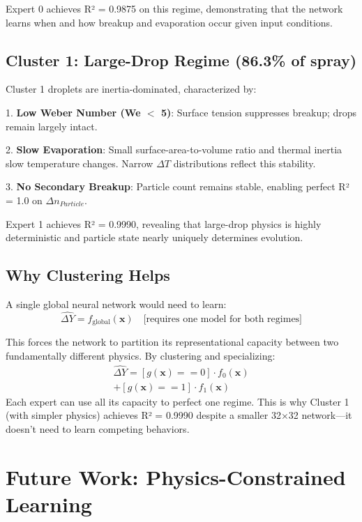 \documentclass[letterpaper,twocolumn,10pt]{article}
\begin{document}
Expert 0 achieves R² = 0.9875 on this regime, demonstrating that the network learns when and how breakup and evaporation occur given input conditions.

\subsection{Cluster 1: Large-Drop Regime (86.3\% of spray)}

Cluster 1 droplets are inertia-dominated, characterized by:

1. \textbf{Low Weber Number (We $<$ 5)}: Surface tension suppresses breakup; drops remain largely intact.

2. \textbf{Slow Evaporation}: Small surface-area-to-volume ratio and thermal inertia slow temperature changes. Narrow $\Delta T$ distributions reflect this stability.

3. \textbf{No Secondary Breakup}: Particle count remains stable, enabling perfect R² = 1.0 on $\Delta n_{Particle}$.

Expert 1 achieves R² = 0.9990, revealing that large-drop physics is highly deterministic and particle state nearly uniquely determines evolution.

\subsection{Why Clustering Helps}

A single global neural network would need to learn:
\begin{equation}
\hat{\Delta Y} = f_{\text{global}}(\mathbf{x}) \quad \text{[requires one model for both regimes]}
\end{equation}

This forces the network to partition its representational capacity between two fundamentally different physics. By clustering and specializing:
\begin{multline*}
\hat{\Delta Y} = [g(\mathbf{x}) == 0] \cdot f_0(\mathbf{x}) \\
+ [g(\mathbf{x}) == 1] \cdot f_1(\mathbf{x})
\end{multline*}
Each expert can use all its capacity to perfect one regime. This is why Cluster 1 (with simpler physics) achieves R² = 0.9990 despite a smaller 32×32 network---it doesn't need to learn competing behaviors.

\section{Future Work: Physics-Constrained Learning}
\end{document}
